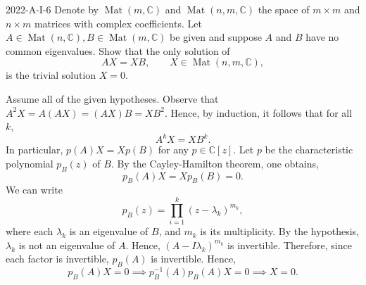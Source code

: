 \documentclass{article}
\begin{document}
	\begin{prb}{2022-A-I-6}
		Denote by $\operatorname{Mat}(m, \mathbb{C})$ and $\operatorname{Mat}(n, m, \mathbb{C})$ the space of $m \times m$ and $n \times m$ matrices with complex coefficients. Let $A \in \operatorname{Mat}(n, \mathbb{C}), B \in \operatorname{Mat}(m, \mathbb{C})$ be given and suppose $A$ and $B$ have no common eigenvalues. Show that the only solution of 
		\begin{equation*}
			AX = XB, \qquad X \in \operatorname{Mat}(n, m, \mathbb{C}), 
		\end{equation*}
		is the trivial solution $X = 0$. 
	\end{prb}
	Assume all of the given hypotheses. Observe that $A^{2}X = A(AX) = (AX)B = XB^{2}$. Hence, by induction, it follows that for all $k$, 
	\begin{equation*}
		A^{k}X = XB^{k}. 
	\end{equation*}
	In particular, $p(A)X = Xp(B)$ for any $p \in \mathbb{C}[z]$. Let $p$ be the characteristic polynomial $p_{B}(z)$ of $B$. By the Cayley-Hamilton theorem, one obtains,
	\begin{equation*}
		p_{B}(A)X = Xp_{B}(B) = 0. 
	\end{equation*}
	We can write 
	\begin{equation*}
		p_{B}(z) = \prod_{i=1}^{k}(z-\lambda_{k})^{m_{k}},  
	\end{equation*}
	where each $\lambda_{k}$ is an eigenvalue of $B$, and $m_{k}$ is its multiplicity. By the hypothesis, $\lambda_{k}$ is not an eigenvalue of $A$. Hence, $(A - I\lambda_{k})^{m_{k}}$ is invertible. Therefore, since each factor is invertible, $p_{B}(A)$ is invertible. Hence, 
	\begin{equation*}
		p_{B}(A)X = 0 \implies p_{B}^{-1}(A)p_{B}(A)X = 0 \implies X = 0. 
	\end{equation*}
	
\end{document}
